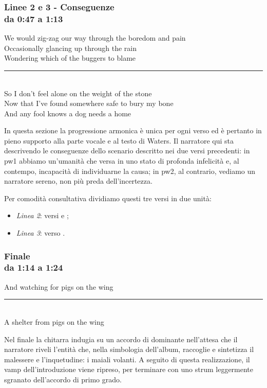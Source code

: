 \documentclass[class=book, crop=false, oneside, 12pt]{standalone}
\begin{document}
    \subsubsection*{Linee 2 e 3 - Conseguenze\\ \small{da 0:47 a 1:13}}
    \begin{displayquote}
        We would zig-zag our way through the boredom and pain \\
        Occasionally glancing up through the rain \\
        Wondering which of the buggers to blame \\
        \vspace{0pt}
        \rule{.4\linewidth}{.5pt} \\ %
        So I don’t feel alone on the weight of the stone \\
        Now that I’ve found somewhere safe to bury my bone \\
        And any fool knows a dog needs a home 
    \end{displayquote}
    In questa sezione la progressione armonica è unica per ogni verso ed è pertanto in pieno supporto alla parte vocale e al testo di Waters. Il narratore qui sta descrivendo le conseguenze dello scenario descritto nei due versi precedenti: in \acrshort{pw1} abbiamo un'umanità che versa in uno stato di profonda infelicità e, al contempo, incapacità di individuarne la causa; in \acrshort{pw2}, al contrario, vediamo un narratore sereno, non più preda dell'incertezza.
    
    Per comodità consultativa dividiamo questi tre versi in due unità: 
    \begin{itemize}
        \item \emph{Linea 2}: versi  e ;
        \item \emph{Linea 3}: verso .
    \end{itemize}
        
        
    \subsubsection*{Finale\\ \small{da 1:14 a 1:24}}
    \begin{displayquote}
        And watching for pigs on the wing \\
        \vspace{0pt}
        \rule{.4\linewidth}{.5pt} \\ %
        A shelter from pigs on the wing 
    \end{displayquote}
    Nel finale la chitarra indugia su un accordo di dominante nell'attesa che il narratore riveli l'entità che, nella simbologia dell'album, raccoglie e sintetizza il malessere e l'inquetudine: i maiali volanti. A seguito di questa realizzazione, il vamp dell'introduzione viene ripreso, per terminare con uno strum leggermente sgranato dell'accordo di primo grado.
    
\end{document}
